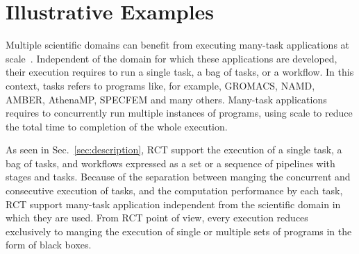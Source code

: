 \documentclass[preprint,12pt, a4paper]{elsarticle}
\begin{document}





\section{Illustrative Examples}\label{sec:examples}




Multiple scientific domains can benefit from executing many-task applications
at scale~\cite{raicu2008many,iosup2011performance}. Independent of the domain
for which these applications are developed, their execution requires to run a
single task, a bag of tasks, or a workflow. In this context, tasks refers to
programs like, for example, GROMACS, NAMD, AMBER, AthenaMP, SPECFEM and many
others. Many-task applications requires to concurrently run multiple
instances of programs, using scale to reduce the total time to completion of
the whole execution.

As seen in Sec.~\ref{sec:description}, RCT support the execution of a single
task, a bag of tasks, and workflows expressed as a set or a sequence of
pipelines with stages and tasks. Because of the separation between manging
the concurrent and consecutive execution of tasks, and the computation
performance by each task, RCT support many-task application independent from
the scientific domain in which they are used. From RCT point of view, every
execution reduces exclusively to manging the execution of single or multiple
sets of programs in the form of black boxes.
\end{document}
